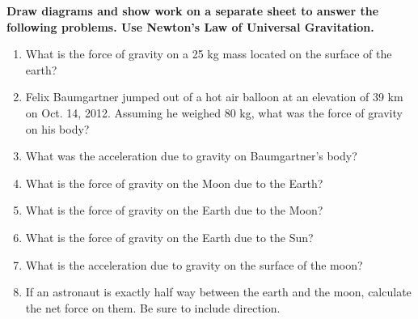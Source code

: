 \documentclass[12pt]{report}
\newcommand{ \probDir}[1]{{ \bf\small #1 \mbox{  }}}
\begin{document}
\pagebreak

\probDir{Draw diagrams and show work on a separate sheet to answer the following problems.  Use Newton's Law of Universal Gravitation.}
\begin{enumerate}
\item What is the force of gravity on a 25 kg mass located on the surface of the earth?
\item Felix Baumgartner jumped out of a hot air balloon at an elevation of 39 km on Oct. 14, 2012.  Assuming he weighed 80 kg, what was the force of gravity on his body?
\item What was the acceleration due to gravity on Baumgartner's body?
\item What is the force of gravity on the Moon due to the Earth?
\item What is the force of gravity on the Earth due to the Moon?
\item What is the force of gravity on the Earth due to the Sun?
\item What is the acceleration due to gravity on the surface of the moon?
\item If an astronaut is exactly half way between the earth and the moon, calculate the net force on them.  Be sure to include direction.

\end{enumerate}
\end{document}
